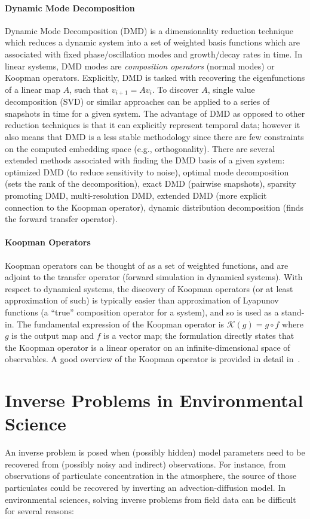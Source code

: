 \paragraph{Dynamic Mode Decomposition} Dynamic Mode Decomposition (DMD) is a dimensionality reduction technique which reduces a dynamic system into a set of weighted basis functions which are associated with fixed phase/oscillation modes and growth/decay rates in time\autocite{schmid2010dynamic}. In linear systems, DMD modes are \emph{composition operators} (normal modes) or Koopman operators. Explicitly, DMD is tasked with recovering the eigenfunctions of a linear map $A$, such that $v_{i+1} = A v_{i}$. To discover $A$, single value decomposition (SVD) or similar approaches can be applied to a series of snapshots in time for a given system. The advantage of DMD as opposed to other reduction techniques is that it can explicitly represent temporal data; however it also means that DMD is a less stable methodology since there are few constraints on the computed embedding space (e.g., orthogonality). There are several extended methods associated with finding the DMD basis of a given system\autocite{chen2012variants}: optimized DMD (to reduce sensitivity to noise), optimal mode decomposition (sets the rank of the decomposition), exact DMD (pairwise snapshots), sparsity promoting DMD, multi-resolution DMD, extended DMD (more explicit connection to the Koopman operator), dynamic distribution decomposition (finds the forward transfer operator).

\paragraph{Koopman Operators} Koopman operators can be thought of as a set of weighted functions, and are adjoint to the transfer operator (forward simulation in dynamical systems). With respect to dynamical systems, the discovery of Koopman operators (or at least approximation of such) is typically easier than approximation of Lyapunov functions (a ``true'' composition operator for a system), and so is used as a stand-in. The fundamental expression of the Koopman operator is $\mathcal{K}(g) = g \circ f$ where $g$ is the output map and $f$ is a vector map; the formulation directly states that the Koopman operator is a linear operator on an infinite-dimensional space of observables. A good overview of the Koopman operator is provided in detail in~\cite{bruce2019koopman}.


\section{Inverse Problems in Environmental Science}
\label{sec:measure_and_model}
An inverse problem is posed when (possibly hidden) model parameters need to be recovered from (possibly noisy and indirect) observations.
For instance, from observations of particulate concentration in the atmosphere, the source of those particulates could be recovered by inverting an advection-diffusion model.
In environmental sciences, solving inverse problems from field data can be difficult for several reasons\autocite{arridge2019solving}: 

